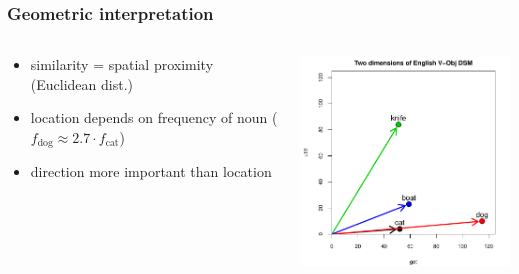 \begin{frame}
  \frametitle{Geometric interpretation}

  \begin{columns}[T]
    \begin{column}{40mm}
      \begin{itemize}
      \item similarity = spatial proximity (Euclidean dist.)
      \item location depends on frequency of noun ($f_{\text{dog}} \approx 2.7\cdot f_{\text{cat}}$)
      \item direction more important than location
      \end{itemize}
    \end{column}
    \begin{column}{75mm}      
      \ungap[1]
      \includegraphics[width=75mm]{img/hieroglyph_2d_3}
    \end{column}
  \end{columns}
\end{frame}

